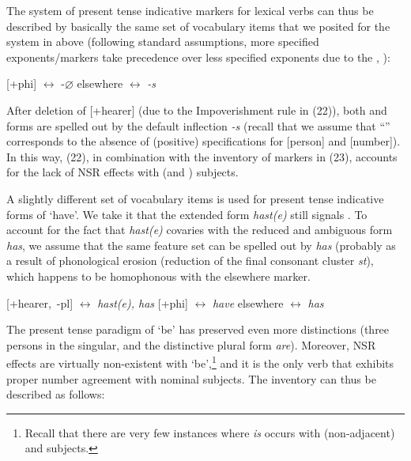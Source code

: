 \documentclass[output=paper]{langsci/langscibook}
\begin{document}
The system of present tense indicative markers for lexical verbs can thus be
described by basically the same set of vocabulary items that we posited for the
system in  above (following standard assumptions, more
specified exponents/markers take precedence over less specified exponents due
to the , \citealt{Kiparsky:1973}):

\ea
\ea \mbox{[+phi]} $\leftrightarrow$ -$\varnothing$
\ex elsewhere $\leftrightarrow$ \emph{-s}
\z
\z

After deletion of [+hearer] (due to the Impoverishment rule in (22)), both
\Ssg{} and \Tsg{} forms are spelled out by the default inflection \emph{-s}
(recall that we assume that ``\Tsg{}'' corresponds to the absence of (positive)
specifications for [person] and [number]). In this way, (22), in combination
with the inventory of  markers in (23), accounts for the lack of
\gls{NSR} effects with \Ssg{} (and \Tsg{}) subjects.

A slightly different set of vocabulary items is used for present tense
indicative forms of `have'. We take it that the extended form \emph{hast(e)}
still signals \Ssg{}. To account for the fact that \emph{hast(e)} covaries with
the reduced and ambiguous form \emph{has}, we assume that the same feature set
can be spelled out by \emph{has} (probably as a result of phonological erosion
(reduction of the final consonant cluster \emph{st}), which happens to be
homophonous with the elsewhere marker.%

\ea
\ea \mbox{[+hearer, -pl]} $\leftrightarrow$ \emph{hast(e), has}
\ex \mbox{[+phi]} $\leftrightarrow$ \emph{have}
\ex elsewhere $\leftrightarrow$ \emph{has}
\z
\z

The present tense paradigm of `be' has preserved even more distinctions (three
persons in the singular, and the distinctive plural form \emph{are}). Moreover,
\gls{NSR} effects are virtually non-existent with `be',\footnote{Recall that
    there are very few instances where \emph{is} occurs with (non-adjacent)
    \Fsg{} and \Ssg{} subjects.} and it is the only verb that exhibits proper
    number agreement with nominal subjects. The
    inventory can thus be described as follows:
\end{document}
